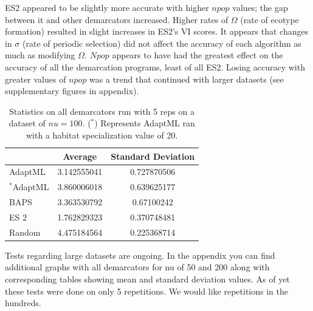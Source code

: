 ES2 appeared to be slightly more accurate with higher $npop$ values; the gap between it and other demarcators increased.
Higher rates of $\Omega$ (rate of ecotype formation) resulted in slight increases in ES2's VI scores.
It appears that changes in $\sigma$ (rate of periodic selection) did not affect the accuracy of each algorithm as much as modifying $\Omega$.
$Npop$ appears to have had the greatest effect on the accuracy of all the demarcation programs, least of all ES2.
Losing accuracy with greater values of $npop$ was a trend that continued with larger datasets (see supplementary figures in appendix).

\begin{table}[h!]
    \begin{tabular}{l|cc}
    ~                    & Average     & Standard Deviation \\ \hline
    AdaptML              & 3.142555041 & 0.727870506        \\
    $^\ast$AdaptML              & 3.860006018 & 0.639625177        \\
    BAPS                 & 3.363530792 & 0.67100242         \\
    ES 2 & 1.762829323 & 0.370748481        \\
    Random               & 4.475184564 & 0.225368714        \\
    \end{tabular}
    \caption[Statistics on all demarcators on $nu=100$.]{Statistics on all demarcators run with 5 reps on a dataset of $nu=100$. ($^\ast$) Represents AdaptML ran with a habitat specialization value of 20. }
        \label{tab:100Allmean}
\end{table}

Tests regarding large datasets are ongoing.
In the appendix you can find additional graphs with all demarcators for nu of 50 and 200 along with corresponding tables showing mean and standard deviation values.
As of yet these tests were done on only 5 repetitions.
We would like repetitions in the hundreds.

